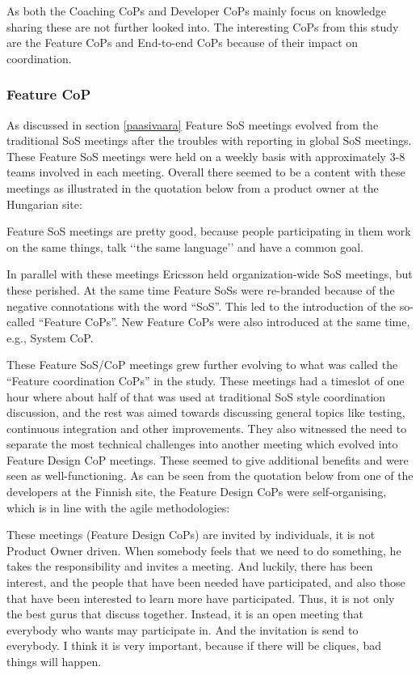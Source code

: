 As both the Coaching CoPs and Developer CoPs mainly focus on knowledge sharing these are not further looked into. The interesting CoPs from this study are the Feature CoPs and End-to-end CoPs because of their impact on coordination.

\subsubsection{Feature CoP}

As discussed in section \ref{paasivaara} Feature SoS meetings evolved from the traditional SoS meetings after the troubles with reporting in global SoS meetings. These Feature SoS meetings were held on a weekly basis with approximately 3-8 teams involved in each meeting. Overall there seemed to be a content with these meetings as illustrated in the quotation below from a product owner at the Hungarian site:

\begin{fancyquotes}
Feature SoS meetings are pretty good, because people participating in them work on the same things, talk ‘‘the same language’’ and have a common goal.
\end{fancyquotes}

In parallel with these meetings Ericsson held organization-wide SoS meetings, but these perished. At the same time Feature SoSs were re-branded because of the negative connotations with the word ``SoS''. This led to the introduction of the so-called ``Feature CoPs''. New Feature CoPs were also introduced at the same time, e.g., System CoP.

These Feature SoS/CoP meetings grew further evolving to what was called the ``Feature coordination CoPs'' in the study. These meetings had a timeslot of one hour where about half of that was used at traditional SoS style coordination discussion, and the rest was aimed towards discussing general topics like testing, continuous integration and other improvements. They also witnessed the need to separate the most technical challenges into another meeting which evolved into Feature Design CoP meetings. These seemed to give additional benefits and were seen as well-functioning. As can be seen from the quotation below from one of the developers at the Finnish site, the Feature Design CoPs were self-organising, which is in line with the agile methodologies:

\begin{fancyquotes}
These meetings (Feature Design CoPs) are invited by individuals, it is not Product Owner driven. When somebody feels that we need to do something, he takes the responsibility and invites a meeting. And luckily, there has been interest, and the people that have been needed have participated, and also those that have been interested to learn more have participated. Thus, it is not only the best gurus that discuss together. Instead, it is an open meeting that everybody who wants may participate in. And the invitation is send to everybody. I think it is very important, because if there will be cliques, bad things will happen.
\end{fancyquotes}

